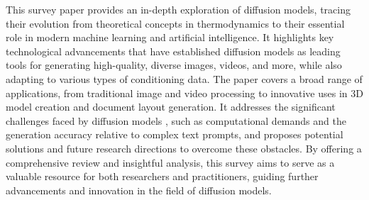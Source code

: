 This survey paper provides an in-depth exploration of diffusion models, 
tracing their evolution from theoretical concepts in thermodynamics to their
essential role in modern machine learning and artificial intelligence. 
It highlights key technological advancements that have established diffusion 
models as leading tools for generating high-quality, diverse images, videos,
and more, while also adapting to various types of conditioning data. The paper 
covers a broad range of applications, from traditional image and video 
processing to innovative uses in 3D model creation and document layout
generation. It addresses the significant challenges faced by diffusion models
, such as computational demands and the generation accuracy relative to complex
text prompts, and proposes potential solutions and future research directions 
to overcome these obstacles. By offering a comprehensive review and insightful 
analysis, this survey aims to serve as a valuable resource for both researchers and practitioners,
guiding further advancements and innovation in the field of diffusion models.